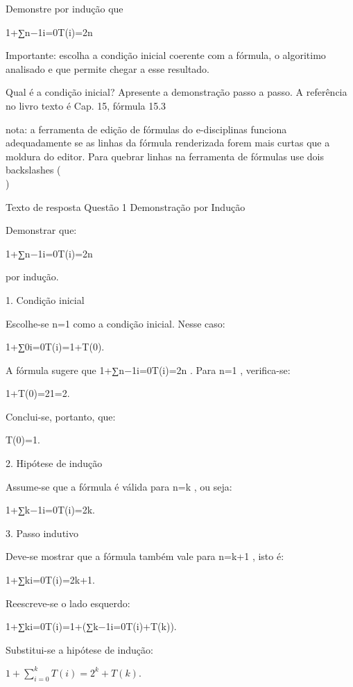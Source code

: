 Demonstre por indução que

1+∑n−1i=0T(i)=2n

Importante: escolha a condição inicial coerente com a fórmula, o algoritimo analisado e que permite chegar a esse resultado.

Qual é a condição inicial?
Apresente a demonstração passo a passo.
A referência no livro texto é Cap. 15, fórmula 15.3

nota: a ferramenta de edição de fórmulas do e-disciplinas funciona adequadamente se as linhas da fórmula renderizada forem mais curtas que a moldura do editor. Para quebrar linhas na ferramenta de fórmulas use dois backslashes (\\)

Texto de resposta Questão 1
Demonstração por Indução



Demonstrar que:

1+∑n−1i=0T(i)=2n

por indução.



1. Condição inicial



Escolhe-se n=1
 como a condição inicial. Nesse caso:

1+∑0i=0T(i)=1+T(0).

A fórmula sugere que 1+∑n−1i=0T(i)=2n
. Para n=1
, verifica-se:

1+T(0)=21=2.



Conclui-se, portanto, que:

T(0)=1.



2. Hipótese de indução

Assume-se que a fórmula é válida para n=k
, ou seja:

1+∑k−1i=0T(i)=2k.



3. Passo indutivo

Deve-se mostrar que a fórmula também vale para n=k+1
, isto é:

1+∑ki=0T(i)=2k+1.



Reescreve-se o lado esquerdo:

1+∑ki=0T(i)=1+(∑k−1i=0T(i)+T(k)).



Substitui-se a hipótese de indução:

\( 1 + \sum_{i=0}^{k} T(i) = 2^k + T(k). \)



